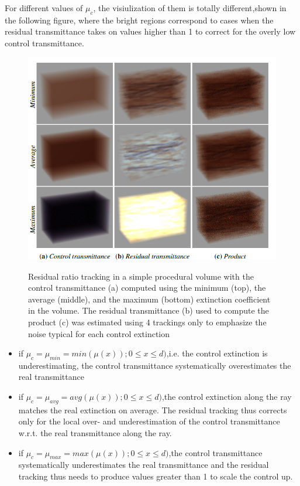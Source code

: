 \documentclass[acmtog]{acmart}
\begin{document}
For different values of $\mu_c$, the visiulization of them is totally different,shown in the following figure, where the bright regions correspond to cases when the residual transmittance takes on values higher than 1 to correct for the overly low control transmittance.
\begin{figure}[htbp]
	\includegraphics[width=\linewidth]{vis.PNG}
	\label{Residual ratio tracking}
	\caption{
		Residual ratio tracking in a simple procedural volume with the control transmittance (a) computed using the minimum (top), the average (middle), and the maximum (bottom) extinction coefficient in the volume. The residual transmittance (b) used to compute the product (c) was estimated using 4 trackings only to
		emphasize the noise typical for each control extinction
	}
\end{figure}
\begin{itemize}
	\item if $\mu_c = \mu_{min} = min(\mu(x));0 \leq x \leq d)$,i.e. the control extinction is underestimating, the control transmittance systematically overestimates the real transmittance
	\item if $\mu_c = \mu_{avg} = avg(\mu(x));0 \leq x \leq d)$,the control extinction
	along the ray matches the real extinction on average. The residual tracking thus corrects only for the local over- and underestimation of the control transmittance w.r.t. the real transmittance along the ray.
	\item if $\mu_c = \mu_{max} = max(\mu(x));0 \leq x \leq d)$,the control transmittance
	systematically underestimates the real transmittance and the residual tracking thus needs to produce values greater than 1 to scale the control up.
\end{itemize}
\end{document}
